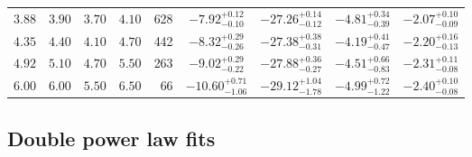\documentclass[a4paper,fleqn,usenatbib]{mnras}
\begin{document}
\begin{table*}
\begin{tabular}{ccccrcccc}
    $3.88$ & $3.90$ & $3.70$ & $4.10$ & 628 & $-7.92^{+0.12}_{-0.10}$ & $-27.26^{+0.14}_{-0.12}$ & $-4.81^{+0.34}_{-0.39}$ & $-2.07^{+0.10}_{-0.09}$ \\
    $4.35$ & $4.40$ & $4.10$ & $4.70$ & 442 & $-8.32^{+0.29}_{-0.26}$ & $-27.38^{+0.38}_{-0.31}$ & $-4.19^{+0.41}_{-0.47}$ & $-2.20^{+0.16}_{-0.13}$ \\
    $4.92$ & $5.10$ & $4.70$ & $5.50$ & 263 & $-9.02^{+0.29}_{-0.22}$ & $-27.88^{+0.36}_{-0.27}$ & $-4.51^{+0.66}_{-0.83}$ & $-2.31^{+0.11}_{-0.08}$ \\
    $6.00$ & $6.00$ & $5.50$ & $6.50$ & 66 & $-10.60^{+0.71}_{-1.06}$ & $-29.12^{+1.04}_{-1.78}$ & $-4.99^{+0.72}_{-1.22}$ & $-2.40^{+0.10}_{-0.08}$ \\
    \hline
  \end{tabular}
\end{table*}

\subsection{Double power law fits}
\label{sec:bins}
\end{document}
